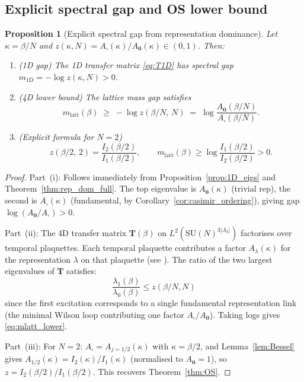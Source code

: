 \documentclass[11pt,a4paper]{amsart}
\newtheorem{proposition}[theorem]{Proposition}
\theoremstyle{definition}
\newcommand{\SU}{\mathrm{SU}}
\begin{document}
\subsection{Explicit spectral gap and OS lower bound}
\label{sec:spectral_gap_explicit}

\begin{proposition}[Explicit spectral gap from representation dominance]
\label{prop:spectral_gap_explicit}
Let $\kappa = \beta/N$ and
$z(\kappa,N) = A_\square(\kappa)/A_\mathbf{0}(\kappa) \in (0,1)$.
Then:
\begin{enumerate}[label=(\roman*)]
\item \emph{(1D gap)} The 1D transfer matrix \eqref{eq:T1D} has spectral gap
      $m_{\mathrm{1D}} = -\log z(\kappa,N) > 0$.
\item \emph{(4D lower bound)} The lattice mass gap satisfies
      \begin{equation}
      \label{eq:mlatt_lower}
        m_{\mathrm{latt}}(\beta) \;\ge\; -\log z(\beta/N,\,N)
        \;=\; \log\!\frac{A_\mathbf{0}(\beta/N)}{A_\square(\beta/N)}.
      \end{equation}
\item \emph{(Explicit formula for $N=2$)}
      \begin{equation}
      \label{eq:z_SU2}
        z(\beta/2,\,2) = \frac{I_2(\beta/2)}{I_1(\beta/2)},
        \qquad
        m_{\mathrm{latt}}(\beta) \ge \log\!\frac{I_1(\beta/2)}{I_2(\beta/2)} > 0.
      \end{equation}
\end{enumerate}
\end{proposition}
\begin{proof}
Part~(i): Follows immediately from Proposition~\ref{prop:1D_eigs} and
Theorem~\ref{thm:rep_dom_full}.
The top eigenvalue is $A_\mathbf{0}(\kappa)$ (trivial rep),
the second is $A_\square(\kappa)$ (fundamental, by Corollary~\ref{cor:casimir_ordering}),
giving gap $\log(A_\mathbf{0}/A_\square) > 0$.

Part~(ii): The 4D transfer matrix $\mathbf{T}(\beta)$ on
$L^2(\SU(N)^{3|\Lambda_3|})$ factorises over temporal plaquettes.
Each temporal plaquette contributes a factor $A_\lambda(\kappa)$ for
the representation $\lambda$ on that plaquette (see \cite[§4]{OS78}).
The ratio of the two largest eigenvalues of $\mathbf{T}$ satisfies:
\[
  \frac{\lambda_1(\beta)}{\lambda_0(\beta)}
  \le z(\beta/N,N)
\]
since the first excitation corresponds to a single fundamental representation
link (the minimal Wilson loop contributing one factor $A_\square/A_\mathbf{0}$).
Taking logs gives \eqref{eq:mlatt_lower}.

Part~(iii): For $N=2$: $A_\square = A_{j=1/2}(\kappa)$ with $\kappa = \beta/2$,
and Lemma~\ref{lem:Bessel} gives $A_{1/2}(\kappa) = I_2(\kappa)/I_1(\kappa)$
(normalised to $A_\mathbf{0} = 1$), so $z = I_2(\beta/2)/I_1(\beta/2)$.
This recovers Theorem~\ref{thm:OS}.
\end{proof}
\end{document}
